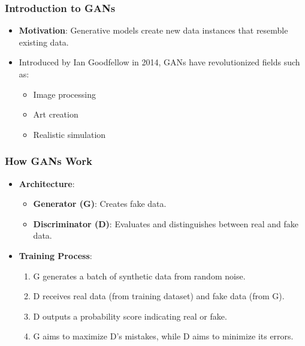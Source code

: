 \documentclass[aspectratio=169]{beamer}
\begin{document}
\begin{frame}[fragile]
    \frametitle{Introduction to GANs}
    \begin{itemize}
        \item \textbf{Motivation}: Generative models create new data instances that resemble existing data.
        \item Introduced by Ian Goodfellow in 2014, GANs have revolutionized fields such as:
        \begin{itemize}
            \item Image processing
            \item Art creation
            \item Realistic simulation
        \end{itemize}
    \end{itemize}
\end{frame}

\begin{frame}[fragile]
    \frametitle{How GANs Work}
    \begin{itemize}
        \item \textbf{Architecture}:
        \begin{itemize}
            \item \textbf{Generator (G)}: Creates fake data.
            \item \textbf{Discriminator (D)}: Evaluates and distinguishes between real and fake data.
        \end{itemize}
        
        \item \textbf{Training Process}:
        \begin{enumerate}
            \item G generates a batch of synthetic data from random noise.
            \item D receives real data (from training dataset) and fake data (from G).
            \item D outputs a probability score indicating real or fake.
            \item G aims to maximize D's mistakes, while D aims to minimize its errors.
        \end{enumerate}
    \end{itemize}
\end{frame}
\end{document}
